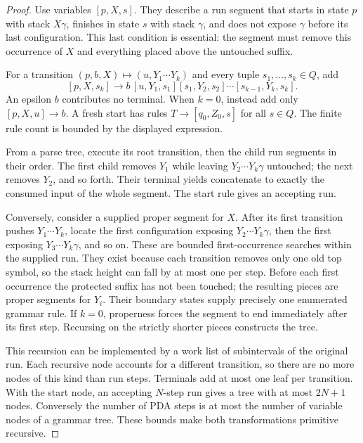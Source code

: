 \begin{proof}
Use variables $[p,X,s]$.  They describe a run segment that starts in state
$p$ with stack $X\gamma$, finishes in state $s$ with stack $\gamma$, and
does not expose $\gamma$ before its last configuration.  This last condition
is essential: the segment must remove this occurrence of $X$ and everything
placed above the untouched suffix.

For a transition $(p,b,X)\mapsto(u,Y_1\cdots Y_k)$ and every tuple
$s_1,\ldots,s_k\in Q$, add
\[
 [p,X,s_k]\to b\,[u,Y_1,s_1][s_1,Y_2,s_2]\cdots
                              [s_{k-1},Y_k,s_k].
\]
An epsilon $b$ contributes no terminal.  When $k=0$, instead add only
$[p,X,u]\to b$.  A fresh start has rules
$T\to[q_0,Z_0,s]$ for all $s\in Q$.  The finite rule count is bounded by
the displayed expression.

From a parse tree, execute its root transition, then the child run
segments in their order.  The first child removes $Y_1$ while leaving
$Y_2\cdots Y_k\gamma$ untouched; the next removes $Y_2$, and so forth.
Their terminal yields concatenate to exactly the consumed input of the
whole segment.  The start rule gives an accepting run.

Conversely, consider a supplied proper segment for $X$.  After its first
transition pushes $Y_1\cdots Y_k$, locate the first configuration exposing
$Y_2\cdots Y_k\gamma$, then the first exposing
$Y_3\cdots Y_k\gamma$, and so on.  These are bounded first-occurrence
searches within the supplied run.  They exist because each transition
removes only one old top symbol, so the stack height can fall by at most
one per step.  Before each first occurrence the protected suffix has not
been touched; the resulting pieces are proper segments for $Y_i$.  Their
boundary states supply precisely one enumerated grammar rule.  If $k=0$,
properness forces the segment to end immediately after its first step.
Recursing on the strictly shorter pieces constructs the tree.

This recursion can be implemented by a work list of subintervals of the
original run.  Each recursive node accounts for a different transition,
so there are no more nodes of this kind than run steps.  Terminals add at
most one leaf per transition.  With the start node, an accepting $N$-step
run gives a tree with at most $2N+1$ nodes.  Conversely the number of PDA
steps is at most the number of variable nodes of a grammar tree.  These
bounds make both transformations primitive recursive.
\end{proof}

